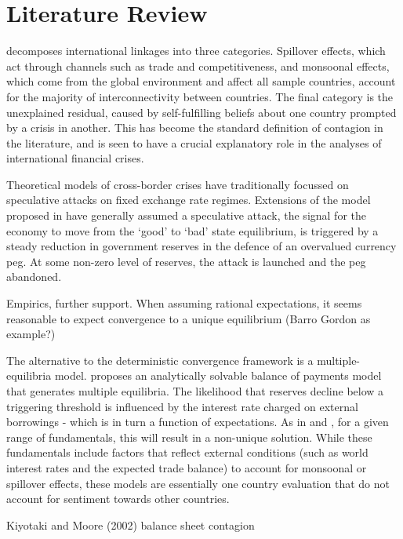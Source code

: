 \documentclass[../base.tex]{subfiles}
\begin{document}
\section{Literature Review}



\cite{masson1998contagion} decomposes international linkages into three categories. Spillover effects, which act through channels such as trade and competitiveness, and monsoonal effects, which come from the global environment and affect all sample countries, account for the majority of interconnectivity between countries. The final category is the unexplained residual, caused by self-fulfilling beliefs about one country prompted by a crisis in another. This has become the standard definition of contagion in the literature, and is seen to have a crucial explanatory role in the analyses of international financial crises.

Theoretical models of cross-border crises have traditionally focussed on speculative attacks on fixed exchange rate regimes. Extensions of the model proposed in \cite{krugman1979model} have generally assumed a speculative attack, the signal for the economy to move from the `good' to `bad' state equilibrium, is triggered by a steady reduction in government reserves in the defence of an overvalued currency peg. At some non-zero level of reserves, the attack is launched and the peg abandoned. 

Empirics, further support. When assuming rational expectations, it seems reasonable to expect convergence to a unique equilibrium (Barro Gordon as example?)

The alternative to the deterministic convergence framework is a multiple-equilibria model. \cite{masson1999contagion} proposes an analytically solvable balance of payments model that generates multiple equilibria. The likelihood that reserves decline below a triggering threshold is influenced by the interest rate charged on external borrowings - which is in turn a function of expectations. As in \cite{jeanne1997currency} and \cite{obstfeld1996models}, for a given range of fundamentals, this will result in a non-unique solution. While these fundamentals include factors that reflect external conditions (such as world interest rates and the expected trade balance) to account for monsoonal or spillover effects, these models are essentially one country evaluation that do not account for sentiment towards other countries. 

Kiyotaki and Moore (2002) balance sheet contagion
\end{document}
